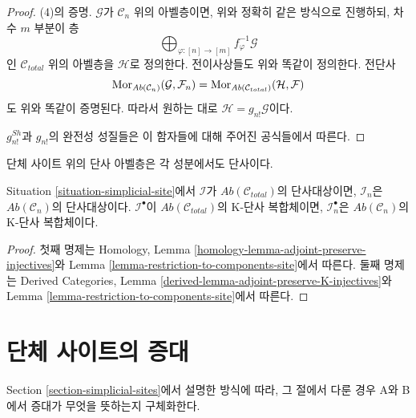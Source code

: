 \begin{proof}
\medskip\noindent
(4)의 증명. $\mathcal{G}$가 $\mathcal{C}_n$ 위의 아벨층이면,
위와 정확히 같은 방식으로 진행하되, 차수 $m$ 부분이 층
$$
\bigoplus\nolimits_{\varphi : [n] \to [m]} f_\varphi^{-1}\mathcal{G}
$$
인 $\mathcal{C}_{total}$ 위의 아벨층을 $\mathcal{H}$로 정의한다.
전이사상들도 위와 똑같이 정의한다. 전단사
$$
\mathop{\mathrm{Mor}}\nolimits_{\textit{Ab}(\mathcal{C}_n)}(\mathcal{G}, \mathcal{F}_n) =
\mathop{\mathrm{Mor}}\nolimits_{\textit{Ab}(\mathcal{C}_{total})}(\mathcal{H}, \mathcal{F})
$$
도 위와 똑같이 증명된다.
따라서 원하는 대로 $\mathcal{H} = g_{n!}\mathcal{G}$이다.

\medskip\noindent
$g^{Sh}_{n!}$과 $g_{n!}$의 완전성 성질들은 이 함자들에 대해
주어진 공식들에서 따른다.
\end{proof}

\begin{lemma}
\label{lemma-restriction-injective-to-component-site}
\begin{slogan}
단체 사이트 위의 단사 아벨층은 각 성분에서도 단사이다.
\end{slogan}
Situation \ref{situation-simplicial-site}에서
$\mathcal{I}$가 $\textit{Ab}(\mathcal{C}_{total})$의 단사대상이면,
$\mathcal{I}_n$은 $\textit{Ab}(\mathcal{C}_n)$의 단사대상이다.
$\mathcal{I}^\bullet$이 $\textit{Ab}(\mathcal{C}_{total})$의
K-단사 복합체이면, $\mathcal{I}_n^\bullet$은
$\textit{Ab}(\mathcal{C}_n)$의 K-단사 복합체이다.
\end{lemma}

\begin{proof}
첫째 명제는 Homology, Lemma
\ref{homology-lemma-adjoint-preserve-injectives}와 Lemma
\ref{lemma-restriction-to-components-site}에서 따른다.
둘째 명제는 Derived Categories, Lemma
\ref{derived-lemma-adjoint-preserve-K-injectives}와 Lemma
\ref{lemma-restriction-to-components-site}에서 따른다.
\end{proof}







\section{단체 사이트의 증대}
\label{section-augmentation-simplicial-sites}

\noindent
Section \ref{section-simplicial-sites}에서 설명한 방식에 따라,
그 절에서 다룬 경우 A와 B에서 증대가 무엇을 뜻하는지 구체화한다.

